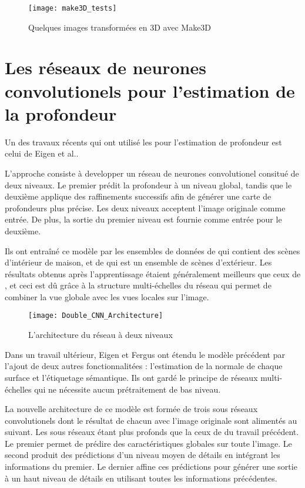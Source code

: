 \begin{figure}[H]
\texttt{[image: make3D\_tests]}
\caption{Quelques images transformées en 3D avec Make3D}{}
\end{figure}

\section{Les réseaux de neurones convolutionels pour l'estimation de la profondeur}

Un des travaux récents qui ont utilisé les 
pour l'estimation de profondeur est celui de Eigen et al.\cite{eigen2014depth}.

L'approche consiste à developper un réseau de neurones convolutionel consitué de
deux niveaux. Le premier prédit la profondeur à un niveau global, tandis que le
deuxième applique des raffinements successifs afin de générer une carte de
profondeurs plus précise. Les deux niveaux acceptent l'image originale comme
entrée. De plus, la sortie du premier niveau est fournie comme entrée pour
le deuxième.

Ils ont entraîné ce modèle par les ensembles de données de  qui
contient des scènes d'intérieur de maison, et de  qui est un ensemble
de scènes d'extérieur. Les résultats obtenus après l'apprentissage étaient
généralement meilleurs que ceux de , et ceci est dû grâce à la
structure multi-échelles du réseau qui permet de combiner la vue globale avec les
vues locales sur l'image.

\begin{figure}[H]
\begin{center}
\texttt{[image: Double\_CNN\_Architecture]}
\caption{L'architecture du réseau à deux niveaux}{}
\end{center}
\end{figure}

Dans un travail ultérieur, Eigen et Fergus\cite{eigen2015predicting} ont étendu
le modèle précédent par l'ajout de deux autres fonctionnalitées : l'estimation
de la normale de chaque surface et l'étiquetage sémantique. Ils ont gardé le
principe de réseaux multi-échelles qui ne nécessite aucun prétraitement de bas
niveau.

La nouvelle architecture de ce modèle est formée de trois sous réseaux
convolutionels dont le résultat de chacun avec l'image originale sont alimentés
au suivant. Les sous réseaux étant plus profonds que la ceux de du travail précédent.
Le premier permet de prédire des caractéristiques globales sur toute l'image.
Le second produit des prédictions d'un niveau moyen de détails en intégrant les
informations du premier. Le dernier affine ces prédictions pour générer une
sortie à un haut niveau de détails en utilisant toutes les informations précédentes.


